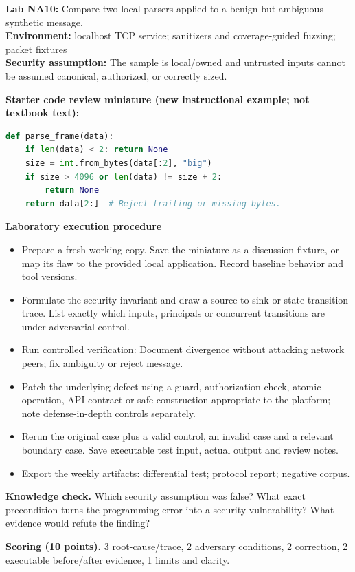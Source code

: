 \documentclass[10pt,letterpaper]{article}
\begin{document}
\begin{insight}\textbf{Lab NA10:} Compare two local parsers applied to a benign but ambiguous synthetic message.\\\textbf{Environment:} localhost TCP service; sanitizers and coverage-guided fuzzing; packet fixtures\\\textbf{Security assumption:} The sample is local/owned and untrusted inputs cannot be assumed canonical, authorized, or correctly sized.\end{insight}
\textbf{Starter code review miniature (new instructional example; not textbook text):}
\begin{lstlisting}[language=Python]
def parse_frame(data):
    if len(data) < 2: return None
    size = int.from_bytes(data[:2], "big")
    if size > 4096 or len(data) != size + 2:
        return None
    return data[2:]  # Reject trailing or missing bytes.
\end{lstlisting}
\textbf{Laboratory execution procedure}
\begin{itemize}[leftmargin=*,itemsep=2pt]
\item Prepare a fresh working copy. Save the miniature as a discussion fixture, or map its flaw to the provided local application. Record baseline behavior and tool versions.
\item Formulate the security invariant and draw a source-to-sink or state-transition trace. List exactly which inputs, principals or concurrent transitions are under adversarial control.
\item Run controlled verification: Document divergence without attacking network peers; fix ambiguity or reject message.
\item Patch the underlying defect using a guard, authorization check, atomic operation, API contract or safe construction appropriate to the platform; note defense-in-depth controls separately.
\item Rerun the original case plus a valid control, an invalid case and a relevant boundary case. Save executable test input, actual output and review notes.
\item Export the weekly artifacts: differential test; protocol report; negative corpus.
\end{itemize}
\textbf{Knowledge check.} Which security assumption was false? What exact precondition turns the programming error into a security vulnerability? What evidence would refute the finding?

\textbf{Scoring (10 points).} 3 root-cause/trace, 2 adversary conditions, 2 correction, 2 executable before/after evidence, 1 limits and clarity.
\end{document}
